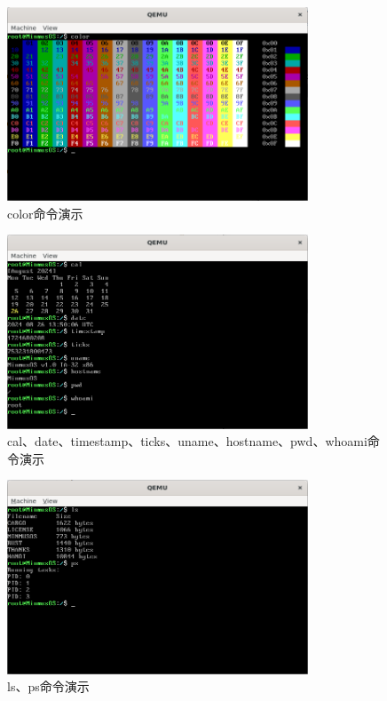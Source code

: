 \begin{figure}[htbp]
    \centering
    \includegraphics[width=0.8\textwidth]{figures/ColorCommandPresentation.png}
    \caption{color命令演示}
\end{figure}

\begin{figure}[htbp]
    \centering
    \includegraphics[width=0.8\textwidth]{figures/CalDateTimestampTicksUnameHostnamePwdWhoamiCommandPresentation.png}
    \caption{cal、date、timestamp、ticks、uname、hostname、pwd、whoami命令演示}
\end{figure}

\begin{figure}[htbp]
    \centering
    \includegraphics[width=0.8\textwidth]{figures/LsPsCommandPresentation.png}
    \caption{ls、ps命令演示}
\end{figure}

